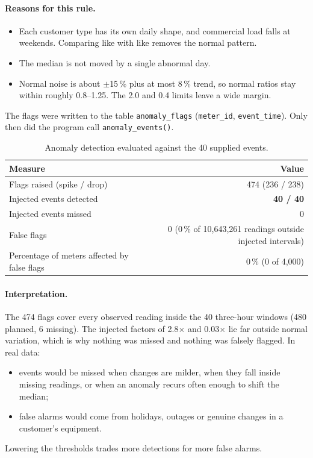 \documentclass[11pt,a4paper]{article}
\begin{document}
\paragraph{Reasons for this rule.}
\begin{itemize}
\item Each customer type has its own daily shape, and commercial load falls at weekends.
Comparing like with like removes the normal pattern.
\item The median is not moved by a single abnormal day.
\item Normal noise is about $\pm$15\,\% plus at most 8\,\% trend, so normal ratios stay
within roughly 0.8--1.25. The 2.0 and 0.4 limits leave a wide margin.
\end{itemize}
The flags were written to the table \texttt{anomaly\_flags} (\texttt{meter\_id},
\texttt{event\_time}). Only then did the program call \texttt{anomaly\_events()}.

\begin{table}[H]\centering\small
\begin{tabular}{lr}\toprule
Measure & Value\\\midrule
Flags raised (spike / drop) & 474 (236 / 238)\\
Injected events detected & \textbf{40 / 40}\\
Injected events missed & 0\\
False flags & 0 (0\,\% of 10,643,261 readings outside injected intervals)\\
Percentage of meters affected by false flags & 0\,\% (0 of 4,000)\\\bottomrule
\end{tabular}
\caption{Anomaly detection evaluated against the 40 supplied events.}
\end{table}

\paragraph{Interpretation.}
The 474 flags cover every observed reading inside the 40 three-hour windows (480
planned, 6 missing). The injected factors of 2.8$\times$ and 0.03$\times$ lie far
outside normal variation, which is why nothing was missed and nothing was falsely
flagged. In real data:
\begin{itemize}
\item events would be missed when changes are milder, when they fall inside missing
readings, or when an anomaly recurs often enough to shift the median;
\item false alarms would come from holidays, outages or genuine changes in a
customer's equipment.
\end{itemize}
Lowering the thresholds trades more detections for more false alarms.
\end{document}
